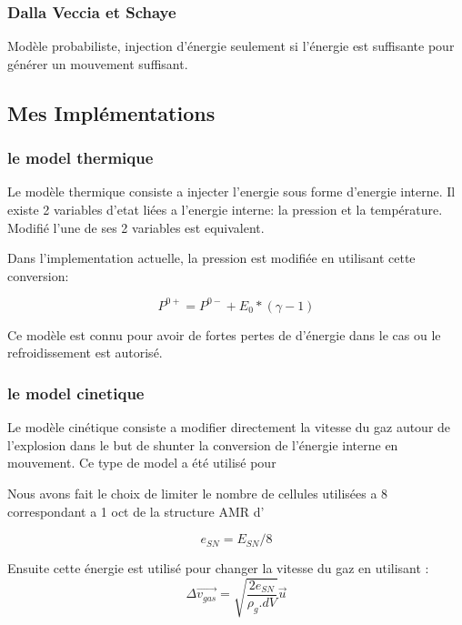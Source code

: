 \subsubsection{Dalla Veccia et Schaye}

Modèle probabiliste, injection d'énergie seulement si l'énergie est suffisante pour générer un mouvement suffisant.


\subsection{Mes Implémentations}


\subsubsection{le model thermique}
Le modèle thermique consiste a injecter l'energie sous forme d'energie interne.
Il existe 2 variables d'etat liées a l'energie interne: la pression et la température.
Modifié l'une de ses 2 variables est equivalent.

Dans l'implementation actuelle, la pression est modifiée en utilisant cette conversion:

\begin{equation}
P^{0+} = P^{0-}  + E_0 * (\gamma-1)
\end{equation}

Ce modèle est connu pour avoir de fortes pertes de d'énergie dans le cas ou le refroidissement est autorisé.


\subsubsection{le model cinetique}


Le modèle cinétique consiste a modifier directement la vitesse du gaz autour de l'explosion dans le but de shunter la conversion de l'énergie interne en mouvement.
Ce type de model a été utilisé pour 

Nous avons fait le choix de limiter le nombre de cellules utilisées a 8 correspondant a 1 oct de la structure AMR d'\emma

\begin{equation}
e_{SN} = E_{SN}/8
\end{equation}

Ensuite cette énergie est utilisé pour changer la vitesse du gaz en utilisant : 
\begin{equation}
    \Delta \overrightarrow{v_{gas}} = \sqrt{\frac{2e_{SN}}{\rho_g.dV}} \overrightarrow{u}
    \label{eq_sn_direct}
\end{equation}


